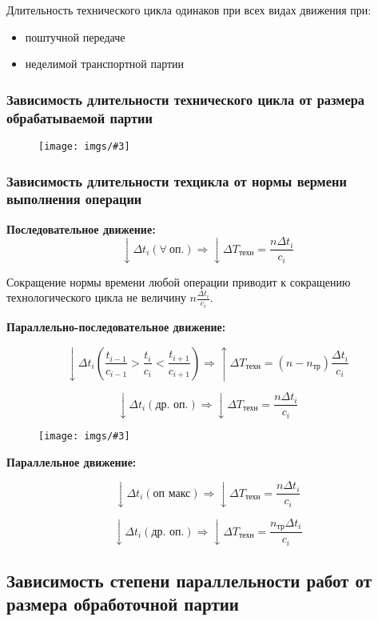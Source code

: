 \documentclass[14pt,a4paper,oneside]{extarticle}
\newcommand{\pic}[3]{
	\begin{figure}[#1]
		\begin{center}
			\texttt{[image: imgs/\#3]}
		\end{center}
	\end{figure}
}
\begin{document}
Длительность технического цикла одинаков при всех видах движения при:

\begin{itemize}
    \item поштучной передаче 
    \item неделимой транспортной партии 
\end{itemize}

\subsubsection{Зависимость длительности технического цикла от размера обрабатываемой партии}

\pic{H}{\textwidth}{13}

\subsubsection{Зависимость длительности техцикла от нормы вермени выполнения операции}

\textbf{Последовательное движение:} \[\downarrow \Delta t_i\left(\forall\ \text{оп.}\right) \Longrightarrow \downarrow \Delta T_\text{техн}=\frac{n\Delta t_i}{c_i} \]

Сокращение нормы времени любой операции приводит к сокращению технологического цикла не величину $n\frac{\Delta t_i}{c_i}$.

\textbf{Параллельно-последовательное движение:} 

\[\downarrow \Delta t_i\left(\frac{t_{i-1}}{c_{i-1}}>\frac{t_i}{c_i}<\frac{t_{i+1}}{c_{i+1}}\right) \Longrightarrow \uparrow \Delta T_\text{техн}=\left(n-n_\text{тр}\right)\frac{\Delta t_i}{c_i}  \]

\[\downarrow \Delta t_i(\text{др. оп.}) \Longrightarrow \downarrow \Delta T_\text{техн}=\frac{n\Delta t_i}{c_i}\]

\pic{H}{\textwidth}{14}

\textbf{Параллельное движение:}

\[\downarrow \Delta t_i (\text{оп макс})\Longrightarrow \downarrow \Delta T_\text{техн}=\frac{n\Delta t_i}{c_i}\]

\[\downarrow \Delta t_i(\text{др. оп.}) \Longrightarrow \downarrow \Delta T_\text{техн}=\frac{n_\text{тр}\Delta t_i}{c_i}\]

\subsection{Зависимость степени параллельности работ от размера обработочной партии}
\end{document}
